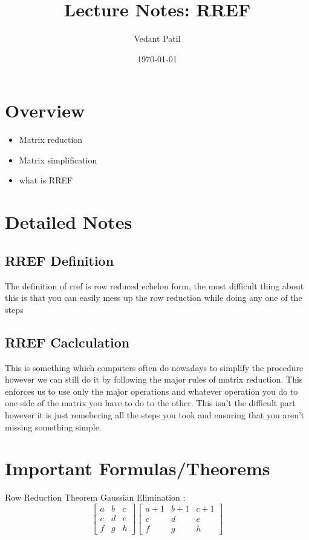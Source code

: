 \documentclass[12pt,a4paper]{article}
\title{Lecture Notes: RREF}
\author{Vedant Patil}
\date{\today}
\begin{document}
\maketitle

\section{Overview}
\begin{tcolorbox}[colback=yellow!10!white,colframe=yellow!50!black,title=Key Points]
  \begin{itemize}
    \item Matrix reduction
    \item Matrix simplification
    \item what is RREF
  \end{itemize}
\end{tcolorbox}

\section{Detailed Notes}
\subsection{RREF Definition}
The definition of rref is row reduced echelon form, the most difficult thing about this is that you can easily mess up the row reduction while doing any one of the steps

\subsection{RREF Caclculation}
This is something which computers often do nowadays to simplify the procedure however we can still do it by following the major rules of matrix reduction.
This enforces us to use only the major operations and whatever operation you do to one side of the matrix you have to do to the other.
This isn't the difficult part however it is just remebering all the steps you took and ensuring that you aren't missing something simple.

\section{Important Formulas/Theorems}
\begin{tcolorbox}[colback=blue!5!white,colframe=blue!75!black,title=Key Formula/Theorem]
  Row Reduction Theorem 
  Gaussian Elimination : \(  \)
  \[
  \begin{bmatrix}
    a & b & c \\ 
    c  & d & e \\ 
    f & g & h 
  \end{bmatrix}
  \begin{bmatrix}
    a + 1 & b + 1  & c + 1 \\ 
    c  & d & e \\ 
    f & g & h 
  \end{bmatrix}
  \]
\end{tcolorbox}
\end{document}
